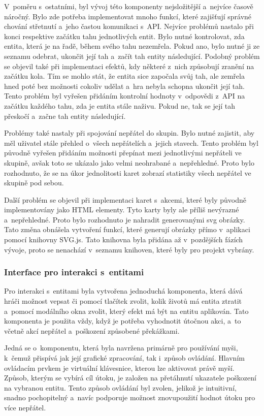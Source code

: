V~poměru s~ostatními, byl vývoj této komponenty nejsložitější a~nejvíce časově náročný. Bylo zde potřeba implementovat mnoho funkcí, které zajišťují správné chování střetnutí a~jeho častou komunikaci s~API. Nejvíce problémů nastalo při konci respektive začátku tahu jednotlivých entit. Bylo nutné kontrolovat, zda entita, která je na řadě, během svého tahu nezemřela. Pokud ano, bylo nutné ji ze seznamu odebrat, ukončit její tah a~začít tah entity následující. Podobný problém se objevil také při implementaci efektů, kdy některé z~nich způsobují zranění na začátku kola. Tím se mohlo stát, že entita sice započala svůj tah, ale zemřela hned poté bez možnosti cokoliv udělat a~hra nebyla schopna ukončit její tah. Tento problém byl vyřešen přidáním kontrolní hodnoty v~odpovědi z~API na začátku každého tahu, zda je entita stále naživu. Pokud ne, tak se její tah přeskočí a~začne tah entity následující.

Problémy také nastaly při spojování nepřátel do skupin. Bylo nutné zajistit, aby měl uživatel stále přehled o~všech nepřátelích a~jejich stavech. Tento problém byl původně vyřešen přidáním možnosti přepínat mezi jednotlivými nepřáteli ve skupině, avšak toto se ukázalo jako velmi neohrabané a~nepřehledné. Proto bylo rozhodnuto, že se na úkor jednolitosti karet zobrazí statistiky všech nepřátel ve skupině pod sebou.

Další problém se objevil při implementaci karet s~akcemi, které byly původně implementovány jako HTML elementy. Tyto karty byly ale příliš nevýrazné a~nepřehledné. Proto bylo rozhodnuto je nahradit generovanými svg obrázky. Tato změna obnášela vytvoření funkcí, které generují obrázky přímo v~aplikaci pomocí knihovny SVG.js. Tato knihovna byla přidána až v~pozdějších fázích vývoje, proto se nenachází v~seznamu knihoven, které byly pro projekt vybrány.

\subsubsection*{Interface pro interakci s~entitami}
Pro interakci s~entitami byla vytvořena jednoduchá komponenta, která dává hráči možnost vepsat či pomocí tlačítek zvolit, kolik životů má entita ztratit a~pomocí modálního okna zvolit, který efekt má být na entitu aplikován. Tato komponenta je použita vždy, když je potřeba vyhodnotit útočnou akci, a~to včetně akcí nepřátel a~poškození způsobené překážkami.

Jedná se o~komponentu, která byla navržena primárně pro používání myši, k~čemuž přispívá jak její grafické zpracování, tak i~způsob ovládání. Hlavním ovládacím prvkem je virtuální klávesnice, kterou lze aktivovat právě myší. Způsob, kterým se vybírá cíl útoku, je založen na přetáhnutí ukazatele poškození na vybranou entitu. Tento způsob ovládání byl zvolen, jelikož je intuitivní, snadno pochopitelný a~navíc podporuje možnost znovupoužití hodnot útoku pro více nepřátel.

